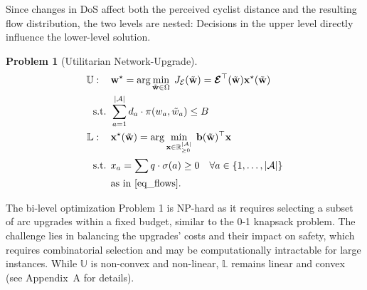 \documentclass[letterpaper, 10 pt, conference]{ieeeconf}  %
\newtheorem{problem}{Problem}
\begin{document}
Since changes in DoS affect both the perceived cyclist distance and the resulting flow distribution, the two levels are nested: Decisions in the upper level directly influence the lower-level solution.

\begin{problem}[Utilitarian Network-Upgrade]
\label{utilitarian_problem}
\begin{align}
\mathbb{U}: \quad  \, &  \mathbf{w}^{\star}  = \arg\min_{\tilde{\mathbf{w}} \in \Omega} \;  J_{\mathcal{E}} (\tilde{\mathbf{w}})  = \boldsymbol{\mathcal{E}}^\top(\tilde{\mathbf{w}}) \mathbf{x}^\star(\tilde{\mathbf{w}})\\
\text{s.t. } & \sum_{a=1}^{|\mathcal{A}|} d_{a} \cdot \pi(w_{a},\tilde{w}_{a}) \leq B \label{budget_constraint} \\
\mathbb{L}: \quad \, & \mathbf{x}^\star(\tilde{\mathbf{w}}) = \arg\min_{\mathbf{x} \in \mathbb{R}^{|\mathcal{A}|}_{\geq 0}} \; \mathbf{b}(\tilde{\mathbf{w}})^\top \mathbf{x} \label{eq_utilitarian_obj} \\
\text{s.t. }  & x_a = \sum q \cdot \sigma(a) \geq 0  \quad \forall a \in \left \{ 1,\dots, |\mathcal{A}| \right   \}  \label{eq_utilitarian_constraints} \\
& \text{as in \eqref{eq_flows}}. \nonumber
\end{align}
\end{problem}
The bi-level optimization Problem 1 is NP-hard as it requires selecting a subset of arc upgrades within a fixed budget, similar to the 0-1 knapsack problem. The challenge lies in balancing the upgrades' costs and their impact on safety, which requires combinatorial selection and may be computationally intractable for large instances. While $\mathbb{U}$ is non-convex and non-linear, $\mathbb{L}$ remains linear and convex (see Appendix~A for details).
\end{document}

